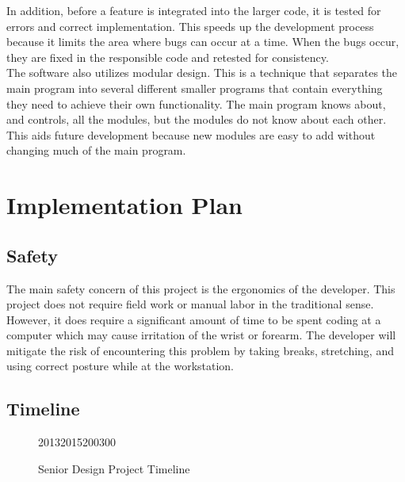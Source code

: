 \documentclass[12pt]{article}
\begin{document}
In addition, before a feature is integrated into the larger code, it is tested for errors and correct implementation. This speeds up the development process because it limits the area where bugs can occur at a time. When the bugs occur, they are fixed in the responsible code and retested for consistency. \\ 

The software also utilizes modular design. This is a technique that separates the main program into several different smaller programs that contain everything they need to achieve their own functionality. The main program knows about, and controls, all the modules, but the modules do not know about each other. This aids future development because new modules are easy to add without changing much of the main program.

\section{Implementation Plan}
\subsection{Safety}

The main safety concern of this project is the ergonomics of the developer. This project does not require field work or manual labor in the traditional sense. However, it does require a significant amount of time to be spent coding at a computer which may cause irritation of the wrist or forearm. The developer will mitigate the risk of encountering this problem by taking breaks, stretching, and using correct posture while at the workstation.

\subsection{Timeline}

\begin{figure}[H]

\begin{timeline}{2013}{2015}{200}{300}
  
  
\end{timeline}
\caption{Senior Design Project Timeline}
\end{figure}
\end{document}
